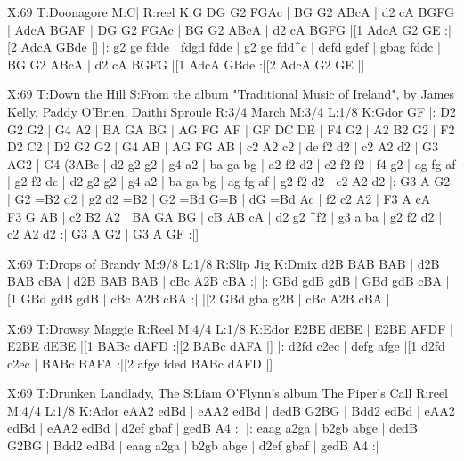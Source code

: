 \documentclass[letterpaper]{article}
\begin{document}
\begin{abc}[name]
X:69
T:Doonagore
M:C|
R:reel
K:G
DG G2 FGAc | BG G2 ABcA | d2 cA BGFG | AdcA BGAF |
DG G2 FGAc | BG G2 ABcA | d2 cA BGFG |[1 AdcA G2 GE :|[2 AdcA GBde |]
|: g2 ge fdde | fdgd fdde | g2 ge fdd^c | defd gdef |
gbag fddc | BG G2 ABcA | d2 cA BGFG |[1 AdcA GBde :|[2 AdcA G2 GE |]
\end{abc}

\begin{abc}[name]
X:69
T:Down the Hill
S:From the album "Traditional Music of Ireland", by James Kelly, Paddy O'Brien, Daithi Sproule
R:3/4 March
M:3/4
L:1/8
K:Gdor
GF |: D2 G2 G2 | G4 A2 | BA GA BG | AG FG AF |
GF DC DE | F4 G2 | A2 B2 G2 | F2 D2 C2 |
D2 G2 G2 | G4 AB | AG FG AB | c2 A2 c2 |
de f2 d2 | c2 A2 d2 | G3 AG2 | G4 (3ABc |
d2 g2 g2 | g4 a2 | ba ga bg | a2 f2 d2 |
c2 f2 f2 | f4 g2 | ag fg af | g2 f2 dc |
d2 g2 g2 | g4 a2 | ba ga bg | ag fg af |
g2 f2 d2 | c2 A2 d2 |: G3 A G2 | G2 =B2 d2 |
g2 d2 =B2 | G2 =Bd G=B | dG =Bd Ac | f2 c2 A2 |
F3 A cA | F3 G AB | c2 B2 A2 | BA GA BG |
cB AB cA | d2 g2 ^f2 | g3 a ba | g2 f2 d2 |
c2 A2 d2 :| G3 A G2 | G3 A GF :|]
\end{abc}

\begin{abc}[name]
X:69
T:Drops of Brandy
M:9/8
L:1/8
R:Slip Jig
K:Dmix
d2B BAB BAB | d2B BAB cBA | d2B BAB BAB | cBc A2B cBA :|
|: GBd gdB gdB | GBd gdB cBA |[1 GBd gdB gdB | cBc A2B cBA :|
|[2 GBd gba g2B | cBc A2B cBA |
\end{abc}

\begin{abc}[name]
X:69
T:Drowsy Maggie
R:Reel
M:4/4
L:1/8
K:Edor
E2BE dEBE | E2BE AFDF | E2BE dEBE |[1 BABc dAFD :|[2 BABc dAFA |]
|: d2fd c2ec | defg afge |[1 d2fd c2ec | BABc BAFA :|[2 afge fded BABc dAFD |]
\end{abc}

\begin{abc}[name]
X:69
T:Drunken Landlady, The
S:Liam O'Flynn's album The Piper's Call
R:reel
M:4/4
L:1/8
K:Ador
eAA2 edBd | eAA2 edBd | dedB G2BG | Bdd2 edBd |
eAA2 edBd | eAA2 edBd | d2ef gbaf | gedB A4 :|
|: eaag a2ga | b2gb abge | dedB G2BG | Bdd2 edBd |
eaag a2ga | b2gb abge | d2ef gbaf | gedB A4 :|
\end{abc}
\end{document}
